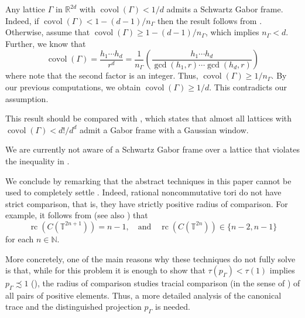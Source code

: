 \documentclass[reqno, a4paper]{amsart}
\numberwithin{equation}{section}
\newcommand{\N}{\mathbb{N}}   %
\newcommand{\R}{\mathbb{R}}   %
\newcommand{\T}{\mathbb{T}}   %
\DeclareMathOperator{\rc}{rc}
\DeclareMathOperator{\covol}{covol}
\begin{document}
\begin{example}
Any lattice $\Gamma$ in $\R^{2d}$ with $\covol(\Gamma) < 1/d$ admits a Schwartz Gabor frame. Indeed, if $\covol(\Gamma) < 1 - (d-1)/n_\Gamma$ then the result follows from . Otherwise, assume that $\covol(\Gamma) \geq 1 - (d-1)/n_\Gamma$, which implies $n_\Gamma<d$. Further, we know that
 \[
 \covol (\Gamma )=\frac{h_1 \cdots h_d}{r^d}=
 \frac{1}{n_\Gamma}\left(\frac{h_1\cdots h_d}{\gcd (h_1, r)\cdots \gcd (h_d , r)}\right)
 \]
 where note that the second factor is an integer. Thus, $\covol (\Gamma )\geq 1/n_\Gamma$. By our previous computations, we obtain $\covol (\Gamma ) \geq 1/d$. This contradicts our assumption.

This result should be compared with \cite[Theorem 1.1]{LuWa23}, which states that almost all lattices with $\covol(\Gamma) < d!/d^d$ admit a Gabor frame with a Gaussian window.
\end{example}

We are currently not aware of a Schwartz Gabor frame over a lattice that violates the inequality in .

\begin{remark}
We conclude by remarking that the abstract techniques in this paper cannot be used to completely settle . Indeed, rational noncommutative tori do not have strict comparison, that is, they have strictly positive radius of comparison. For example, it follows from \cite[Corollary~1.2]{EllNiu13RadiusCompCommutative} (see also \cite[Section~4.1]{BlaRobTikTomWin12AlgRC}) that 
\[
\rc(C(\T^{2n+1})) = n-1 ,\quad\text{and}\quad
\rc(C(\T^{2n})) \in \{ n-2, n-1 \}
\]
for each $n\in\N$.

More concretely, one of the main reasons why these techniques do not fully solve  is that, while for this problem it is enough to show that $\tau (p_\Gamma) <\tau (1)$ implies $p_\Gamma\precsim 1$ (), the radius of comparison studies tracial comparison (in the sense of ) of all pairs of positive elements. Thus, a more detailed analysis of the canonical trace and the distinguished projection $p_\Gamma$ is needed.
\end{remark}



\end{document}
